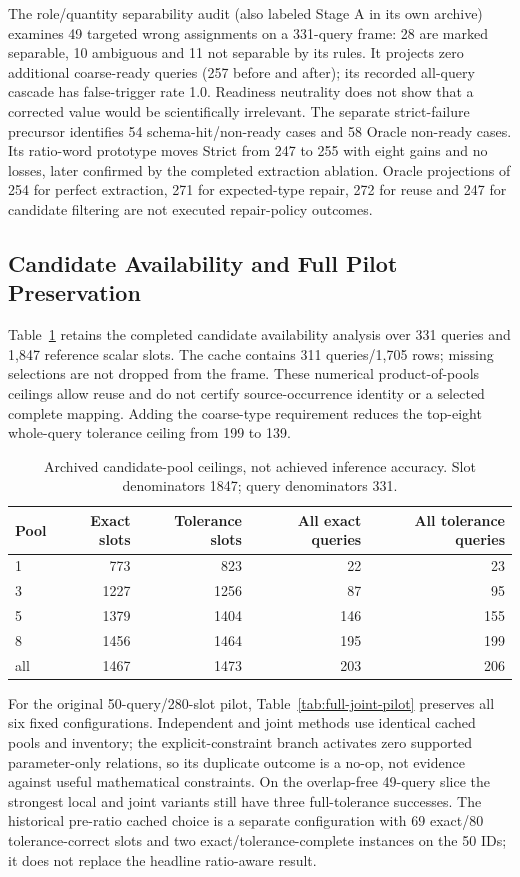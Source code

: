 The role/quantity separability audit (also labeled Stage A in its own archive) examines 49 targeted wrong assignments on a 331-query frame: 28 are marked separable, 10 ambiguous and 11 not separable by its rules. It projects zero additional coarse-ready queries (257 before and after); its recorded all-query cascade has false-trigger rate 1.0. Readiness neutrality does not show that a corrected value would be scientifically irrelevant. The separate strict-failure precursor identifies 54 schema-hit/non-ready cases and 58 Oracle non-ready cases. Its ratio-word prototype moves Strict from 247 to 255 with eight gains and no losses, later confirmed by the completed extraction ablation. Oracle projections of 254 for perfect extraction, 271 for expected-type repair, 272 for reuse and 247 for candidate filtering are not executed repair-policy outcomes.

\subsection{Candidate Availability and Full Pilot Preservation}
Table~\ref{tab:cached-ceilings} retains the completed candidate availability analysis over 331 queries and 1,847 reference scalar slots. The cache contains 311 queries/1,705 rows; missing selections are not dropped from the frame. These numerical product-of-pools ceilings allow reuse and do not certify source-occurrence identity or a selected complete mapping. Adding the coarse-type requirement reduces the top-eight whole-query tolerance ceiling from 199 to 139.

\begin{table}[htbp]\centering\small
\caption{Archived candidate-pool ceilings, not achieved inference accuracy. Slot denominators 1847; query denominators 331.}\label{tab:cached-ceilings}
\begin{tabular}{@{}lrrrr@{}}\toprule
Pool & Exact slots & Tolerance slots & All exact queries & All tolerance queries\\\midrule
1 & 773 & 823 & 22 & 23\\
3 & 1227 & 1256 & 87 & 95\\
5 & 1379 & 1404 & 146 & 155\\
8 & 1456 & 1464 & 195 & 199\\
all & 1467 & 1473 & 203 & 206\\
\bottomrule\end{tabular}\end{table}

For the original 50-query/280-slot pilot, Table~\ref{tab:full-joint-pilot} preserves all six fixed configurations. Independent and joint methods use identical cached pools and inventory; the explicit-constraint branch activates zero supported parameter-only relations, so its duplicate outcome is a no-op, not evidence against useful mathematical constraints. On the overlap-free 49-query slice the strongest local and joint variants still have three full-tolerance successes. The historical pre-ratio cached choice is a separate configuration with 69 exact/80 tolerance-correct slots and two exact/tolerance-complete instances on the 50 IDs; it does not replace the headline ratio-aware result.

